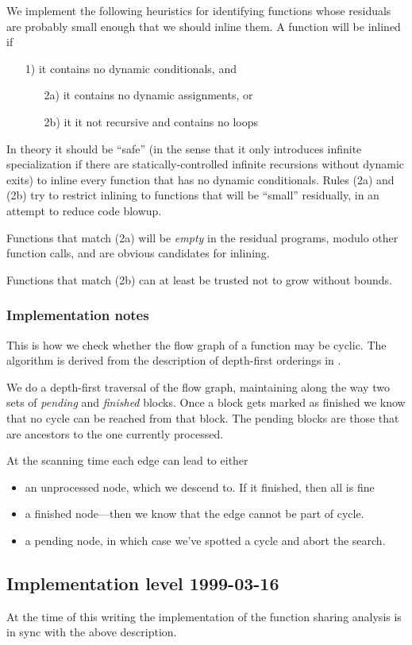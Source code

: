 \begin{docpart}
We implement the following heuristics for identifying functions whose
residuals are probably small enough that we should inline them. A
function will be inlined if
\begin{itemize}
\item[1)] it contains no dynamic conditionals, and
\begin{itemize}
\item[2a)] it contains no dynamic assignments, or
\item[2b)] it it not recursive and contains no loops
\end{itemize}\end{itemize}
 In theory it should be ``safe'' (in the sense that it
 only introduces infinite specialization if there are
 statically-controlled infinite recursions without
 dynamic exits) to inline every function that has no
 dynamic conditionals. Rules (2a) and (2b) try to
 restrict inlining to functions that will be ``small''
 residually, in an attempt to reduce code blowup.

   Functions that match (2a) will be \emph{empty} in the
 residual programs, modulo other function calls, and
 are obvious candidates for inlining.

Functions that match (2b) can at least be trusted
not to grow without bounds.

\subsubsection{Implementation notes}

This is how we check whether the flow graph of a function
may be cyclic. The algorithm is derived from the description
of depth-first orderings in .

   We do a depth-first traversal of the flow graph,
 maintaining along the way two sets of \emph{pending} and
 \emph{finished} blocks. Once a block gets marked as
 finished we know that no cycle can be reached from
 that block. The pending blocks are those that are
 ancestors to the one currently processed.

   At the scanning time each edge can lead to either
\begin{itemize}
\item an unprocessed node, which we descend to. If it
     finished, then all is fine
\item a finished node---then we know that the edge
     cannot be part of cycle.
\item a pending node, in which case we've spotted a
     cycle and abort the search.
\end{itemize}

\subsection{Implementation level 1999-03-16}

At the time of this writing the implementation of the function
sharing analysis is in sync with the above description.

\end{docpart}
